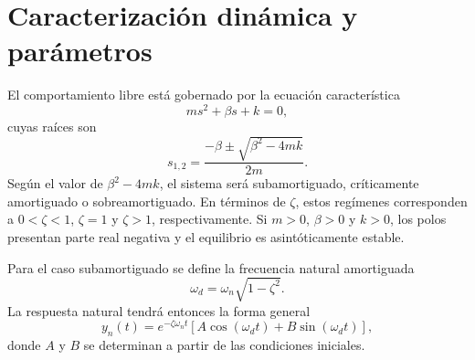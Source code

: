 \section{Caracterización dinámica y parámetros}

El comportamiento libre está gobernado por la ecuación característica
\begin{equation}
  ms^2+\beta s+k=0,
\end{equation}
cuyas raíces son
\begin{equation}
  s_{1,2}=\frac{-\beta\pm\sqrt{\beta^2-4mk}}{2m}.
  \label{eq:polos}
\end{equation}
Según el valor de $\beta^2-4mk$, el sistema será subamortiguado, críticamente amortiguado o sobreamortiguado. En términos de $\zeta$, estos regímenes corresponden a $0<\zeta<1$, $\zeta=1$ y $\zeta>1$, respectivamente. Si $m>0$, $\beta>0$ y $k>0$, los polos presentan parte real negativa y el equilibrio es asintóticamente estable.

Para el caso subamortiguado se define la frecuencia natural amortiguada
\begin{equation}
  \omega_d=\omega_n\sqrt{1-\zeta^2}.
\end{equation}
La respuesta natural tendrá entonces la forma general
\begin{equation}
  y_n(t)=e^{-\zeta\omega_nt}
  \left[A\cos(\omega_dt)+B\sin(\omega_dt)\right],
  \label{eq:respuesta_natural}
\end{equation}
donde $A$ y $B$ se determinan a partir de las condiciones iniciales.


